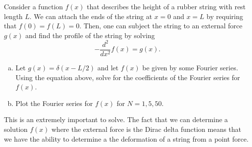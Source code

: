 \documentclass[12pt]{article} %
\begin{document}
\newpage
\begin{problem}
Consider a function $f(x)$ that describes the height of a rubber string with rest length $L$. We can attach the ends of the string at $x=0$ and $x=L$ by requiring that $f(0)=f(L)=0$.  Then, one can subject the string to an external force $g(x)$ and find the profile of the string by solving
\[
-\frac{d^2}{dx^2} f(x) = g(x).
\]
\begin{enumerate}[(a)]
	\item Let $g(x)=\delta(x-L/2)$ and let $f(x)$ be given by some Fourier series.  Using the equation above, solve for the coefficients of the Fourier series for $f(x)$.
	\item Plot the Fourier series for $f(x)$ for $N=1,5,50$.
\end{enumerate}
This is an extremely important to solve. The fact that we can determine a solution $f(x)$ where the external force is the Dirac delta function means that we have the ability to determine a the deformation of a string from a point force.
\end{problem}
\end{document}
